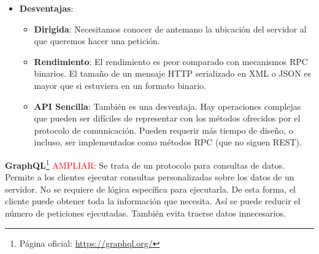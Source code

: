 \begin{itemize}
  \item \textbf{Desventajas}:

  \begin{itemize}
    \item \textbf{Dirigida}: Necesitamos conocer de antemano la ubicación del servidor al que queremos hacer una petición.

    \item \textbf{Rendimiento}: El rendimiento es peor comparado con mecanismos RPC binarios. El tamaño de un mensaje HTTP serializado en XML o JSON es mayor que si estuviera en un formato binario.

    \item \textbf{API Sencilla}: También es una desventaja. Hay operaciones complejas que pueden ser difíciles de representar con los métodos ofrecidos por el protocolo de comunicación. Pueden requerir más tiempo de diseño, o incluso, ser implementados como métodos RPC (que no siguen REST).
  \end{itemize}
\end{itemize}

\textbf{GraphQL}\footnote{Página oficial: \url{https://graphql.org/}} \textcolor{red}{AMPLIAR}: Se trata de un protocolo para consultas de datos. Permite a los clientes ejecutar consultas personalizadas sobre los datos de un servidor. No se requiere de lógica específica para ejecutarla. De esta forma, el cliente puede obtener toda la información que necesita. Así se puede reducir el número de peticiones ejecutadas. También evita traerse datos innecesarios.


